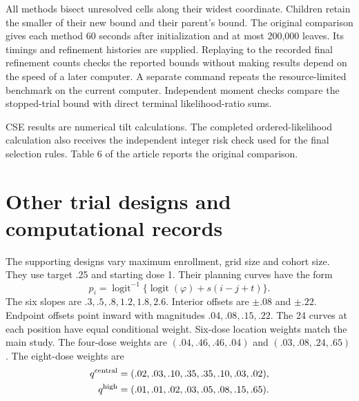 \documentclass[letterpaper,12pt]{article}
\begin{document}
All methods bisect unresolved cells along their widest coordinate.
Children retain the smaller of their new bound and their parent's
bound. The original comparison gives each method 60 seconds after
initialization and at most 200,000 leaves. Its timings and refinement
histories are supplied. Replaying to the recorded final refinement
counts checks the reported bounds without making results depend on
the speed of a later computer. A separate command repeats the
resource-limited benchmark on the current computer. Independent
moment checks compare the stopped-trial bound with direct terminal
likelihood-ratio sums.

CSE results are numerical tilt calculations. The completed
ordered-likelihood calculation also receives the independent integer
risk check used for the final selection rules. Table 6 of the article
reports the original comparison.

\section{Other trial designs and computational records}

The supporting designs vary maximum enrollment, grid size and cohort
size. They use target .25 and starting dose 1. Their planning curves
have the form
\[
 p_i=\operatorname{logit}^{-1}
 \{\operatorname{logit}(\varphi)+s(i-j+t)\}.
\]
The six slopes are $.3,.5,.8,1.2,1.8,2.6$. Interior offsets are
$\pm.08$ and $\pm.22$. Endpoint offsets point inward with magnitudes
$.04,.08,.15,.22$. The 24 curves at each position have equal
conditional weight. Six-dose location weights match the main study.
The four-dose weights are $(.04,.46,.46,.04)$ and
$(.03,.08,.24,.65)$. The eight-dose weights are
\[
\begin{split}
 q^{\rm central}&=(.02,.03,.10,.35,.35,.10,.03,.02),\\
 q^{\rm high}&=(.01,.01,.02,.03,.05,.08,.15,.65).
\end{split}
\]
\end{document}
